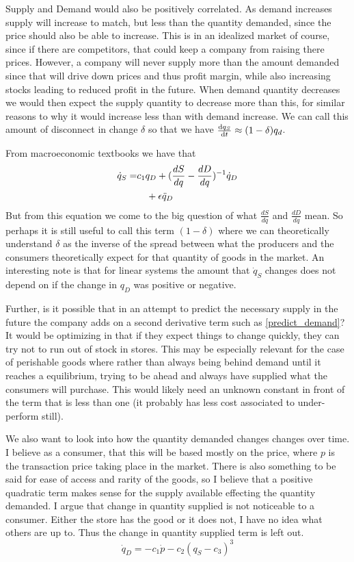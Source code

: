 \documentclass{article}
\begin{document}
Supply and Demand would also be positively correlated. As demand increases supply will increase to match, but less than the quantity demanded, since the price should also be able to increase. This is in an idealized market of course, since if there are competitors, that could keep a company from raising there prices. However, a company will never supply more than the amount demanded since that will drive down prices and thus profit margin, while also increasing stocks leading to reduced profit in the future. When demand quantity decreases we would then expect the supply quantity to decrease more than this, for similar reasons to why it would increase less than with demand increase. We can call this amount of disconnect in change $\delta$ so that we have $\frac{\mathrm{d} q_S}{\mathrm{d} t} \approx (1-\delta)q_d$.

From macroeconomic textbooks we have that 
\begin{align}
	\dot{q}_S = &  c_1 q_D + (\frac{dS}{dq} - \frac{dD}{dq})^{-1}\dot{q}_D \\
	& \ \ \ +\eps\ddot{q}_D %
\end{align}
But from this equation we come to the big question of what $\frac{dS}{dq}$ and $\frac{dD}{dq}$ mean. So perhaps it is still useful to call this term $(1-\delta)$ where we can theoretically understand $\delta$ as the inverse of the spread between what the producers and the consumers theoretically expect for that quantity of goods in the market. An interesting note is that for linear systems the amount that $\dot{q}_S$ changes does not depend on if the change in $q_D$ was positive or negative.

Further, is it possible that in an attempt to predict the necessary supply in the future the company adds on a second derivative term such as \eqref{predict_demand}? 
It would be optimizing in that if they expect things to change quickly, they can try not to run out of stock in stores. This may be especially relevant for the case of perishable goods where rather than always being behind demand until it reaches a equilibrium, trying to be ahead and always have supplied what the consumers will purchase. This would likely need an unknown constant in front of the term that is less than one (it probably has less cost associated to under-perform still). 

We also want to look into how the quantity demanded changes changes over time. I believe as a consumer, that this will be based mostly on the price, where $p$ is the transaction price taking place in the market. There is also something to be said for ease of access and rarity of the goods, so I believe that a positive quadratic term makes sense for the supply available effecting the quantity demanded. I argue that change in quantity supplied is not noticeable to a consumer. Either the store has the good or it does not, I have no idea what others are up to. Thus the change in quantity supplied term is left out. 
\begin{equation}
		\dot{q}_D = - c_1 \dot{p} - c_2(q_S-c_3)^3
\end{equation}
\end{document}
